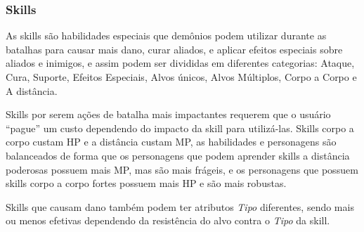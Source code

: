 \documentclass[
	12pt,				%
	openright,			%
	twoside,			%
	a4paper,			%
	english,			%
	french,				%
	spanish,			%
	brazil				%
	]{abntex2}
\begin{document}
\subsubsection{Skills}

As skills são habilidades especiais que demônios podem utilizar durante as batalhas para causar mais dano, curar aliados, e aplicar efeitos especiais sobre aliados e inimigos, e assim podem ser divididas em diferentes categorias: Ataque, Cura, Suporte, Efeitos Especiais, Alvos únicos, Alvos Múltiplos, Corpo a Corpo e A distância.

Skills por serem ações de batalha mais impactantes requerem que o usuário “pague” um custo dependendo do impacto da skill para utilizá-las. Skills corpo a corpo custam HP e a distância custam MP, as habilidades e personagens são balanceados de forma que os personagens que podem aprender skills a distância poderosas possuem mais MP, mas são mais frágeis, e os personagens que possuem skills corpo a corpo fortes possuem mais HP e são mais robustas.

Skills que causam dano também podem ter atributos \emph{Tipo} diferentes, sendo mais ou menos efetivas dependendo da resistência do alvo contra o \emph{Tipo} da skill.
\end{document}
